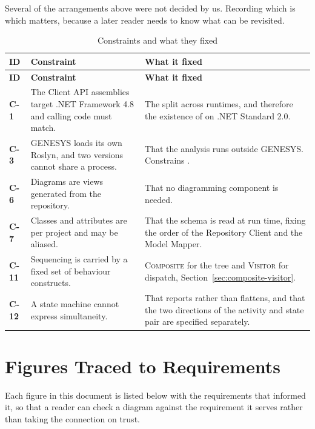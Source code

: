 Several of the arrangements above were not decided by us. Recording which is
which matters, because a later reader needs to know what can be revisited.

\begin{longtable}{L{0.10\textwidth}L{0.40\textwidth}L{0.42\textwidth}}
	\caption{Constraints and what they fixed}\label{tab:constraints-arch}\\
	\toprule
	\textbf{ID} & \textbf{Constraint} & \textbf{What it fixed} \\
	\midrule
	\endfirsthead
	\toprule
	\textbf{ID} & \textbf{Constraint} & \textbf{What it fixed} \\
	\midrule
	\endhead

	\textbf{C-1} & The Client API assemblies target .NET Framework 4.8 and
	calling code must match. & The split across runtimes, and therefore the
	existence of  on .NET Standard 2.0. \\
	\addlinespace
	\textbf{C-3} & GENESYS loads its own Roslyn, and two versions cannot share
	a process. & That the analysis runs outside GENESYS. Constrains
	. \\
	\addlinespace
	\textbf{C-6} & Diagrams are views generated from the repository. & That no
	diagramming component is needed. \\
	\addlinespace
	\textbf{C-7} & Classes and attributes are per project and may be aliased.
	& That the schema is read at run time, fixing the order of the Repository
	Client and the Model Mapper. \\
	\addlinespace
	\textbf{C-11} & Sequencing is carried by a fixed set of behaviour
	constructs. & \textsc{Composite} for the tree and \textsc{Visitor} for
	dispatch, Section~\ref{sec:composite-visitor}. \\
	\addlinespace
	\textbf{C-12} & A state machine cannot express simultaneity. & That
	 reports rather than flattens, and that the two directions of
	the activity and state pair are specified separately. \\
	\bottomrule
\end{longtable}

\section{Figures Traced to Requirements}

Each figure in this document is listed below with the requirements that
informed it, so that a reader can check a diagram against the requirement it
serves rather than taking the connection on trust.

